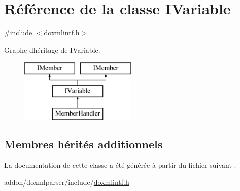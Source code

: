 \hypertarget{class_i_variable}{}\section{Référence de la classe I\+Variable}
\label{class_i_variable}


{\ttfamily \#include $<$doxmlintf.\+h$>$}

Graphe d\textquotesingle{}héritage de I\+Variable\+:\begin{figure}[H]
\begin{center}
\leavevmode
\includegraphics[height=3.000000cm]{class_i_variable}
\end{center}
\end{figure}
\subsection*{Membres hérités additionnels}


La documentation de cette classe a été générée à partir du fichier suivant \+:\begin{DoxyCompactItemize}
\item 
addon/doxmlparser/include/\hyperlink{include_2doxmlintf_8h}{doxmlintf.\+h}\end{DoxyCompactItemize}
